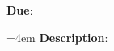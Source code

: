 \documentclass{article}
\begin{document}
\textbf{Due}:

\hangindent=4em
\textbf{Description}:
\end{document}
